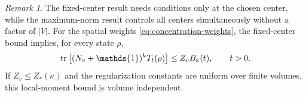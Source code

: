 \documentclass[11pt]{article}
\theoremstyle{myplain}
\theoremstyle{mydefinition}
\theoremstyle{remark}
\newtheorem{rmk}[ex]{Remark}
\DeclareMathOperator{\1}{\mathds{1}}
\newcommand{\tr}[1][]{\operatorname{tr}%
  \ifx#1\empty \else \left[ #1 \right] \fi}
\begin{document}
        \begin{rmk}
            The fixed-center result needs conditions only at the chosen center, while the maximum-norm result controls all centers simultaneously without a factor of $|V|$.
            For the spatial weights \eqref{eq:concentration-weights}, the fixed-center bound implies, for every state $\rho$,
            \begin{equation}\label{eq:uniform-local-moment}
                \tr[(N_v + \1)^k T_t(\rho)] \leq Z_v B_k(t),\qquad t > 0.
            \end{equation}
            If $Z_v \leq Z_*(\kappa)$ and the regularization constants are uniform over finite volumes, this local-moment bound is volume independent.
        \end{rmk}
        
\end{document}
